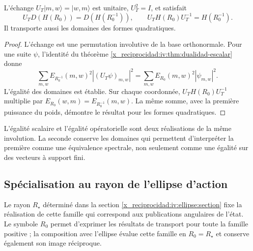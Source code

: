 \begin{theorem}
\label{x_reciprocidad:iv:thm:t-unitaria}
\label{x_reciprocidad:prop:dualidad-radios-k}
L’échange
\(U_T|m,w\rangle=|w,m\rangle\) est unitaire,
\(U_T^2=I\), et satisfait
\begin{equation}
 U_TD(H(R_0))=D(H(R_0^{-1})),
 \qquad U_TH(R_0)U_T^{-1}=H(R_0^{-1}).
 \label{x_reciprocidad:iv:eq:conjugacion-h}
\end{equation}
Il transporte aussi les domaines des formes quadratiques.
\end{theorem}
\begin{proof}
L’échange est une permutation involutive de la base
orthonormale. Pour une suite \(\psi\), l’identité du
théorème \ref{x_reciprocidad:iv:thm:dualidad-escalar} donne
\[
 \sum_{m,w}E_{R_0^{-1}}(m,w)^2|(U_T\psi)_{m,w}|^2
 =\sum_{m,w}E_{R_0}(m,w)^2|\psi_{m,w}|^2.
\]
L’égalité des domaines est établie. Sur chaque coordonnée,
\(U_TH(R_0)U_T^{-1}\) multiplie par
\(E_{R_0}(w,m)=E_{R_0^{-1}}(m,w)\). La même somme, avec
la première puissance du poids, démontre le résultat pour les
formes quadratiques.
\end{proof}

L’égalité scalaire et l’égalité opératorielle sont deux réalisations
de la même involution. La seconde conserve les domaines qui
permettent d’interpréter la première comme une équivalence spectrale,
non seulement comme une égalité sur des vecteurs à support fini.

\subsection{Spécialisation au rayon de l’ellipse d’action}

Le rayon \(R_\star\) déterminé dans la section
\ref{x_reciprocidad:iv:ellipse:section} fixe la réalisation de cette famille qui
correspond aux publications angulaires de l’état. Le symbole
\(R_0\) permet d’exprimer les résultats de transport pour toute la
famille positive ; la composition avec l’ellipse évalue cette famille en
\(R_0=R_\star\) et conserve également son image réciproque.

